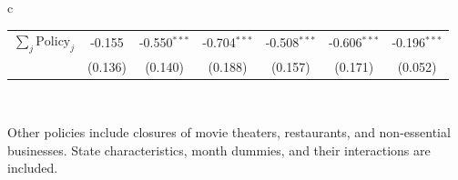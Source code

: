 \documentclass{beamer}
\def\bcolor{\color{forestgreen(web)}}
\def\pcolor{\color{blue}}
\renewcommand{\to}{{\rightarrow}}
\begin{document}
\begin{frame}
\begin{table}
\begin{minipage}{\linewidth}
\begin{tabular}{c}
\begin{tabular}{lccc|c|c|c}
$\sum_j \mathrm{Policy}_j$ & -0.155 & -0.550$^{***}$ & -0.704$^{***}$ & -0.508$^{***}$ & -0.606$^{***}$ & -0.196$^{***}$\\
 & (0.136) & (0.140) & (0.188) & (0.157) & (0.171) & (0.052)\\
\bottomrule
\end{tabular}     \\
  \end{tabular}
  \end{minipage}
\end{table}
\begin{flushleft}
\tiny
Other policies include closures of movie theaters, restaurants, and non-essential businesses. State characteristics, month dummies, and their interactions are included.
\end{flushleft}
\end{frame}
\end{document}
